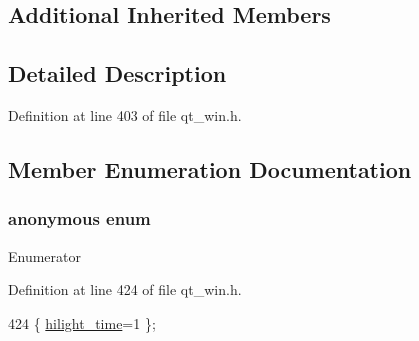 \subsection*{Additional Inherited Members}


\subsection{Detailed Description}


Definition at line 403 of file qt\+\_\+win.\+h.



\subsection{Member Enumeration Documentation}
\hypertarget{classNetHackQtStatusWindow_aec59be9b40977af9e5fe6df34c9cb1fd}{\subsubsection[{anonymous enum}]{\setlength{\rightskip}{0pt plus 5cm}anonymous enum\hspace{0.3cm}{\ttfamily [private]}}}\label{classNetHackQtStatusWindow_aec59be9b40977af9e5fe6df34c9cb1fd}
\begin{Desc}
\item[Enumerator]\par
\begin{description}
\item[{\em 
\hypertarget{classNetHackQtStatusWindow_aec59be9b40977af9e5fe6df34c9cb1fda67c56cc2a88e7730e32df56762e3557c}{hilight\+\_\+time}\label{classNetHackQtStatusWindow_aec59be9b40977af9e5fe6df34c9cb1fda67c56cc2a88e7730e32df56762e3557c}
}]\end{description}
\end{Desc}


Definition at line 424 of file qt\+\_\+win.\+h.


\begin{DoxyCode}
424 \{ \hyperlink{classNetHackQtStatusWindow_aec59be9b40977af9e5fe6df34c9cb1fda67c56cc2a88e7730e32df56762e3557c}{hilight\_time}=1 \};
\end{DoxyCode}



